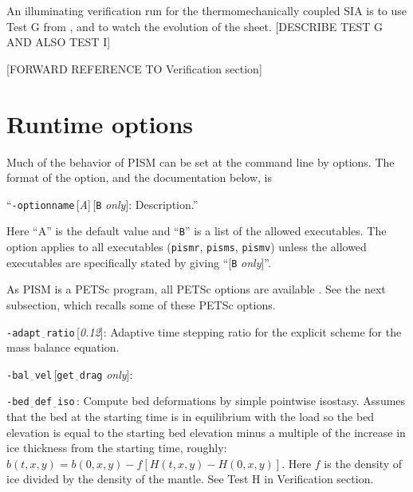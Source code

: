 \documentclass[11pt,final]{amsart}
\renewcommand{\t}[1]{\texttt{#1}}
\begin{document}
An illuminating verification run for the thermomechanically coupled SIA is to use Test G from \cite{BBL}, and to watch the evolution of the sheet. [DESCRIBE TEST G AND ALSO TEST I]

[FORWARD REFERENCE TO Verification section] 


\section{Runtime options}

\newcommand{\opt}[1]{\vspace{1mm}\noindent \large\texttt{-#1}\,:\quad\normalsize}
\newcommand{\optdef}[2]{\vspace{1mm}\noindent \large\texttt{-#1}\,[\textsl{#2}]:\quad\normalsize}
\newcommand{\optrestrict}[2]{\vspace{1mm}\noindent \large\texttt{-#1}\,[\texttt{#2} \textsl{only}]:\quad\normalsize}
\newcommand{\optdefrestrict}[3]{\vspace{1mm}\noindent \large\texttt{-#1}\,[\textsl{#2}]\,[\texttt{#3} \textsl{only}]:\quad\normalsize}
\newcommand{\und}{$\underline{\,\,\,}$}

Much of the behavior of PISM can be set at the command line by options.  The format of the option, and the documentation below, is

\centerline{``\optdefrestrict{optionname}{A}{B} Description.''}

\noindent Here ``A'' is the default value and ``\t{B}'' is a list of the allowed executables.  The option applies to all executables (\verb|pismr|, \verb|pisms|, \verb|pismv|) unless the allowed executables are specifically stated by giving ``[\t{B} \textsl{only}]''.

As PISM is a PETSc program, all PETSc options are available \cite{petsc-web-page,petsc-user-ref}.  See the next subsection, which recalls some of these PETSc options.
\bigskip

\optdef{adapt\und ratio}{0.12}  Adaptive time stepping ratio for the explicit scheme for the mass balance equation.

\optrestrict{bal\und vel}{get\und drag}  

\opt{bed\und def\und iso} Compute bed deformations by simple pointwise isostasy.  Assumes that the bed at the starting time is in equilibrium with the load so the bed elevation is equal to the starting bed elevation minus a multiple of the increase in ice thickness from the starting time, roughly: $b(t,x,y) = b(0,x,y) - f [H(t,x,y) - H(0,x,y)]$.  Here $f$ is the density of ice divided by the density of the mantle.  See Test H in Verification section.
\end{document}
